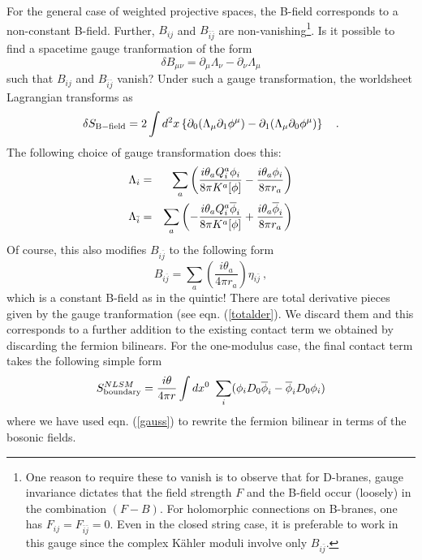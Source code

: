 \documentclass[a4paper,12pt]{article}
\begin{document}
For the general case of weighted projective spaces, the B-field corresponds 
to a non-constant B-field. Further, $B_{ij}$ and $B_{\bar{i}\bar{j}}$ are
non-vanishing\footnote{One reason to require these to vanish is to
observe that for D-branes, gauge invariance dictates that the
field strength $F$ and the B-field occur (loosely) in the combination
$(F-B)$. For holomorphic connections on B-branes, one has
$F_{ij}=F_{\bar{i}\bar{j}}=0$. Even in the closed string case, it
is preferable to work in this gauge since the complex K\"ahler moduli
involve only $B_{i\bar{j}}$.}.
Is it possible to find a spacetime gauge tranformation
of the form
\begin{equation}
\delta B_{\mu\nu} = \partial_\mu \Lambda_\nu - \partial_\nu \Lambda_\mu
\end{equation}
such that $B_{ij}$ and $B_{\bar{i}\bar{j}}$ vanish? Under such a
gauge transformation, the worldsheet Lagrangian transforms as
\begin{equation}
\delta S_{\rm B-field} = 2 \int d^2x \left\{ \partial_0 (\Lambda_\mu
\partial_1 \phi^\mu) - \partial_1 (\Lambda_\mu 
\partial_0 \phi^\mu) \right\}\quad.
\label{totalder}
\end{equation}
The following choice of gauge transformation does this:
\begin{eqnarray}
\Lambda_i &=& \sum_a \left({{i\theta_a Q^a_i \phi_i}\over{8\pi K^a[\phi]}} 
- {{i\theta_a \phi_i}\over{8\pi r_a}}\right) \\
\Lambda_{\bar i} &=& \sum_a 
\left(-{{i\theta_a Q^a_i \overline{\phi}_i}\over{8\pi K^a[\phi]}}
+ {{i\theta_a \overline{\phi}_i}\over{8\pi r_a}}\right) 
\end{eqnarray}
Of course, this also modifies $B_{i\overline{j}}$ to the following form
\begin{equation}
B_{i\overline{j}} =
\sum_a \left(\frac{i\theta_a}{4\pi r_a} \right)\eta_{i\bar{j}}\ ,
\end{equation}
which is a constant B-field as in the quintic! There are total
derivative pieces given by the gauge tranformation (see eqn.
(\ref{totalder}). We discard
them and this corresponds to a further addition to the existing contact term 
we obtained by discarding the fermion bilinears. 
For the one-modulus case, the final contact term 
takes the following simple form 
\begin{equation}
S^{NLSM}_{\rm boundary}= {{i\theta}\over{4\pi r}} \int dx^0\ 
\sum_i (\phi_i D_0\overline{\phi}_i - \overline{\phi}_iD_0 \phi_i)
\label{nlsmcontact}
\end{equation}
where we have used eqn. (\ref{gauss}) to rewrite the fermion bilinear in
terms of the bosonic fields.
\end{document}
